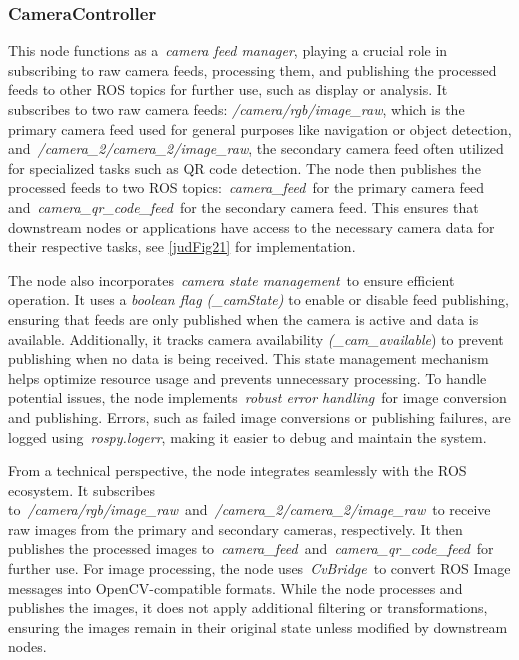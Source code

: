 \documentclass[a4paper,12pt]{extreport}
\begin{document}
\subsubsection{CameraController}

This node functions as a~\emph{camera feed manager}, playing a crucial
role in subscribing to raw camera feeds, processing them, and publishing
the processed feeds to other ROS topics for further use, such as display
or analysis. It subscribes to two raw camera
feeds: \emph{/camera/rgb/image\_raw}, which is the primary camera feed
used for general purposes like navigation or object detection,
and~\emph{/camera\_2/camera\_2/image\_raw}, the secondary camera feed
often utilized for specialized tasks such as QR code detection. The node
then publishes the processed feeds to two ROS
topics:~\emph{camera\_feed}~for the primary camera feed
and~\emph{camera\_qr\_code\_feed}~for the secondary camera feed. This
ensures that downstream nodes or applications have access to the
necessary camera data for their respective tasks, see \cref{judFig21} for
implementation.

The node also incorporates~\emph{camera state management}~to ensure
efficient operation. It uses a \emph{boolean flag (\_camState)} to
enable or disable feed publishing, ensuring that feeds are only
published when the camera is active and data is available. Additionally,
it tracks camera availability \emph{(\_cam\_available}) to prevent
publishing when no data is being received. This state management
mechanism helps optimize resource usage and prevents unnecessary
processing. To handle potential issues, the node implements~\emph{robust
error handling}~for image conversion and publishing. Errors, such as
failed image conversions or publishing failures, are logged
using~\emph{rospy.logerr}, making it easier to debug and maintain the
system.

From a technical perspective, the node integrates seamlessly with the
ROS ecosystem. It subscribes
to~\emph{/camera/rgb/image\_raw}~and~\emph{/camera\_2/camera\_2/image\_raw}~to
receive raw images from the primary and secondary cameras, respectively.
It then publishes the processed images
to~\emph{camera\_feed~}and\emph{~camera\_qr\_code\_feed}~for further
use. For image processing, the node uses~\emph{CvBridge}~to convert ROS
Image messages into OpenCV-compatible formats. While the node processes
and publishes the images, it does not apply additional filtering or
transformations, ensuring the images remain in their original state
unless modified by downstream nodes.
\end{document}
